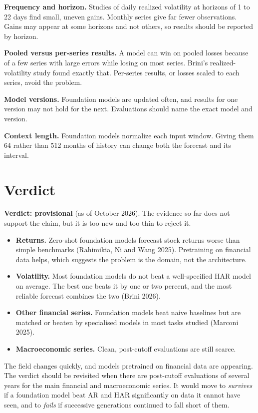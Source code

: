 \textbf{Frequency and horizon.} Studies of daily realized volatility at horizons of 1 to 22 days find small, uneven gains. Monthly series give far fewer observations. Gains may appear at some horizons and not others, so results should be reported by horizon.

\textbf{Pooled versus per-series results.} A model can win on pooled losses because of a few series with large errors while losing on most series. Brini's realized-volatility study found exactly that. Per-series results, or losses scaled to each series, avoid the problem.

\textbf{Model versions.} Foundation models are updated often, and results for one version may not hold for the next. Evaluations should name the exact model and version.

\textbf{Context length.} Foundation models normalize each input window. Giving them 64 rather than 512 months of history can change both the forecast and its interval.

\section{Verdict}
\label{sec:22-verdict}

\begin{callout}
\textbf{Verdict: provisional} (as of October 2026). The evidence so far does not support the claim, but it is too new and too thin to reject it.
\end{callout}

\begin{itemize}
  \item \textbf{Returns.} Zero-shot foundation models forecast stock returns worse than simple benchmarks (Rahimikia, Ni and Wang 2025). Pretraining on financial data helps, which suggests the problem is the domain, not the architecture.
  \item \textbf{Volatility.} Most foundation models do not beat a well-specified HAR model on average. The best one beats it by one or two percent, and the most reliable forecast combines the two (Brini 2026).
  \item \textbf{Other financial series.} Foundation models beat naive baselines but are matched or beaten by specialised models in most tasks studied (Marconi 2025).
  \item \textbf{Macroeconomic series.} Clean, post-cutoff evaluations are still scarce.
\end{itemize}

The field changes quickly, and models pretrained on financial data are appearing. The verdict should be revisited when there are post-cutoff evaluations of several years for the main financial and macroeconomic series. It would move to \emph{survives} if a foundation model beat AR and HAR significantly on data it cannot have seen, and to \emph{fails} if successive generations continued to fall short of them.

